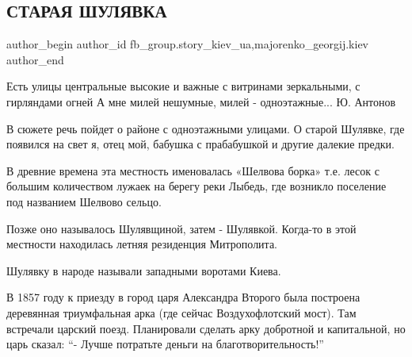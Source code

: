  
 
 
 
 
 
\subsection{СТАРАЯ ШУЛЯВКА}
\label{sec:26_12_2021.fb.fb_group.story_kiev_ua.5.staraja_shuljavka}
 
\ifcmt
 author_begin
   author_id fb_group.story_kiev_ua,majorenko_georgij.kiev
 author_end
\fi


\begin{zznagolos}
\obeycr
Есть улицы центральные
высокие и важные
с витринами зеркальными,
с гирляндами огней
А мне милей нешумные,
милей - одноэтажные...
\smallskip
Ю. Антонов
\restorecr
\end{zznagolos}


В сюжете речь пойдет о районе с одноэтажными улицами. О старой Шулявке, где
появился на свет я, отец мой, бабушка с прабабушкой и другие далекие предки. 



В древние времена эта местность именовалась «Шелвова борка» т.е. лесок с
большим количеством лужаек на берегу реки Лыбедь, где возникло поселение под
названием Шелвово сельцо.

Позже оно называлось Шулявщиной, затем - Шулявкой. Когда-то в этой местности
находилась летняя резиденция Митрополита.


Шулявку в народе называли западными воротами Киева. 

В 1857 году к приезду в город царя Александра Второго была построена деревянная
триумфальная арка (где сейчас Воздухофлотский мост). Там встречали царский
поезд. Планировали сделать арку добротной и капитальной, но царь сказал:
\enquote{- Лучше потратьте деньги на благотворительность!}



